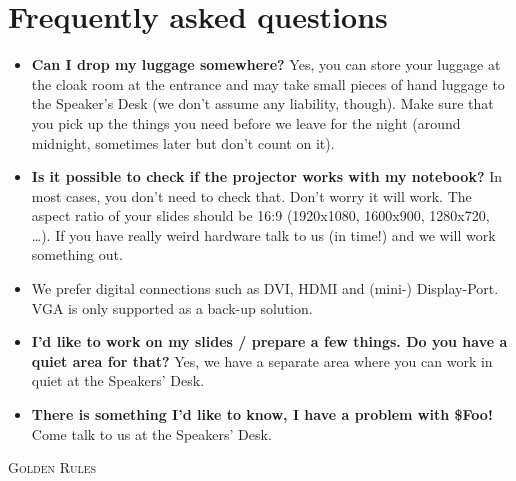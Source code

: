 \documentclass[paper=a4]{scrartcl}
\begin{document}
	\section*{Frequently asked questions}
	\begin{itemize}
		\item \textbf{Can I drop my luggage somewhere?} Yes, you can store your luggage at the cloak room at the entrance and may take small pieces of hand luggage to the Speaker's Desk (we don't assume any liability, though). Make sure that you pick up the things you need before we leave for the night (around midnight, sometimes later but don't count on it).
		\item \textbf{Is it possible to check if the projector works with my notebook?} In most cases, you don't need to check that. Don't worry it will work. The aspect ratio of your slides should be 16:9 (1920x1080, 1600x900, 1280x720, \ldots). If you have really weird hardware talk to us (in time!) and we will work something out.
		\item We prefer digital connections such as DVI, HDMI and (mini-) Display-Port. VGA is only supported as a back-up solution. 
		\item \textbf{I'd like to work on my slides / prepare a few things. Do you have a quiet area for that?} Yes, we have a separate area where you can work in quiet at the Speakers' Desk.
		\item \textbf{There is something I'd like to know, I have a problem with \$Foo!} Come talk to us at the Speakers' Desk.
	\end{itemize}
\newpage
\begin{center} \textsc{\Huge Golden Rules}\end{center}
\end{document}
